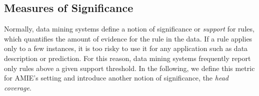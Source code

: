 
\subsection{Measures of Significance} \label{subsec:statSignificance}



Normally, data mining systems define a notion of significance or \emph{support} for rules, which quantifies the amount of evidence for the rule in the data.
If a rule applies only to a few instances, it is too risky to use it for any application such as data description or prediction. For this reason,
data mining systems frequently report only rules above a given support threshold. 
In the following, we define this metric for AMIE's setting and introduce another notion of significance, the \emph{head coverage}.


